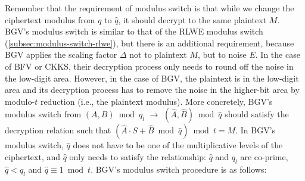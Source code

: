 Remember that the requirement of modulus switch is that while we change the ciphertext modulus from $q$ to $\hat q$, it should decrypt to the same plaintext $M$. BGV's modulus switch is similar to that of the RLWE modulus switch (\autoref{subsec:modulus-switch-rlwe}), but there is an additional requirement, because BGV applies the scaling factor $\Delta$ not to plaintext $M$, but to noise $E$. In the case of BFV or CKKS, their decryption process only needs to round off the noise in the low-digit area. However, in the case of BGV, the plaintext is in the low-digit area and its decryption process has to remove the noise in the higher-bit area by modulo-$t$ reduction (i.e., the plaintext modulus). More concretely, BGV's modulus switch from $(A, B) \bmod q_{l}$ $\rightarrow$  $(\hat{A}, \hat{B}) \bmod \hat{q}$ should satisfy the decryption relation such that $(\hat{A} \cdot S + \hat{B} \bmod \hat{q}) \bmod t = M$. In BGV's modulus switch, $\hat{q}$ does not have to be one of the multiplicative levels of the ciphertext, and $\hat{q}$ only needs to satisfy the relationship: $\hat{q}$ and $q_l$ are co-prime, $\hat{q} < q_l$ and $\hat{q} \equiv 1 \bmod t$. BGV's modulus switch procedure is as follows:

$ $

